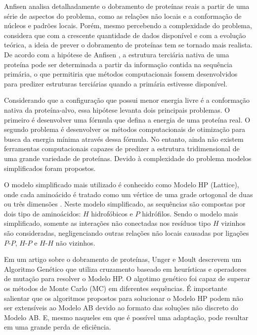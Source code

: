 \documentclass[dm,ppgcomp]{texfurg}
\begin{document}
Anfisen \cite{anfinsen1972studies} analisa detalhadamente o dobramento de proteínas reais a partir de uma série de aspectos do problema, como as relações não locais e a conformação de núcleos e padrões locais. Porém, mesmo percebendo a complexidade do problema, considera que com a crescente quantidade de dados disponível e com a evolução teórica, a ideia de prever o dobramento de proteínas tem se tornado mais realista. De acordo com a hipótese de Anfisen \cite{anfinsen1973principles}, a estrutura terciária nativa de uma proteína pode ser determinada a partir da informação contida na sequência primária, o que permitiria que métodos computacionais fossem desenvolvidos para predizer estruturas terciárias quando a primária estivesse disponível. 

Considerando que a configuração que possui menor energia livre é a conformação nativa da proteína-alvo, essa hipótese levanta dois principais problemas. O primeiro é desenvolver uma fórmula que defina a energia de uma proteína real. O segundo problema é desenvolver os métodos computacionais de otimização para busca da energia mínima através dessa fórmula. No entanto, ainda não existem ferramentas computacionais capazes de predizer a estrutura tridimensional de uma grande variedade de proteínas. Devido à complexidade do problema modelos simplificados foram propostos.

O modelo simplificado mais utilizado é conhecido como Modelo HP (Lattice), onde cada aminoácido é tratado como um vértice de uma grade ortogonal de duas ou três dimensões \cite{dill1985theory}. Neste modelo simplificado, as sequências são compostas por dois tipo de aminoácidos: $H$ hidrofóbicos e $P$ hidrófilos. Sendo o modelo mais simplificado, somente as interações não conectadas nos resíduos tipo $H$ vizinhos são consideradas, negligenciando outras relações não locais causadas por ligações $P$-$P$, $H$-$P$ e $H$-$H$ não vizinhos. 

Em um artigo sobre o dobramento de proteínas, Unger e Moult \cite{unger1993genetic} descrevem um Algoritmo Genético que utiliza cruzamento baseado em heurísticas e operadores de mutação para resolver o Modelo HP. O algotimo genético foi capaz de superar os métodos de Monte Carlo (MC) \cite{stillinger1995collective} em diferentes sequências. É importante salientar que os algoritmos propostos para solucionar o Modelo HP podem não ser extensíveis ao Modelo AB devido ao formato das soluções não discreto do Modelo AB. E, mesmo naqueles em que é possível uma adaptação, pode resultar em uma grande perda de eficiência.
\end{document}
